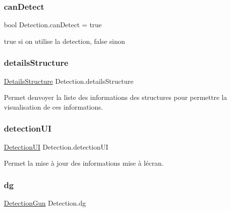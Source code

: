 \subsubsection{\texorpdfstring{can\+Detect}{canDetect}}
{\footnotesize\ttfamily bool Detection.\+can\+Detect = true\hspace{0.3cm}{\ttfamily [private]}}



true si on utilise la detection, false sinon 

\mbox{\label{class_detection_aa183bc717a4ba8c4371e319eb16fcd23}} 
\subsubsection{\texorpdfstring{details\+Structure}{detailsStructure}}
{\footnotesize\ttfamily \mbox{\hyperlink{class_details_structure}{Details\+Structure}} Detection.\+details\+Structure\hspace{0.3cm}{\ttfamily [private]}}



Permet d\textquotesingle{}envoyer la liste des informations des structures pour permettre la visualisation de ces informations. 

\mbox{\label{class_detection_a2cb88a432e8b2083f27a286a32daf936}} 
\subsubsection{\texorpdfstring{detection\+UI}{detectionUI}}
{\footnotesize\ttfamily \mbox{\hyperlink{class_detection_u_i}{Detection\+UI}} Detection.\+detection\+UI\hspace{0.3cm}{\ttfamily [private]}}



Permet la mise à jour des informations mise à l\textquotesingle{}écran. 

\mbox{\label{class_detection_a87f5c7e3ca25b83485fd648d0a512ae5}} 
\subsubsection{\texorpdfstring{dg}{dg}}
{\footnotesize\ttfamily \mbox{\hyperlink{class_detection_gun}{Detection\+Gun}} Detection.\+dg\hspace{0.3cm}{\ttfamily [private]}}



